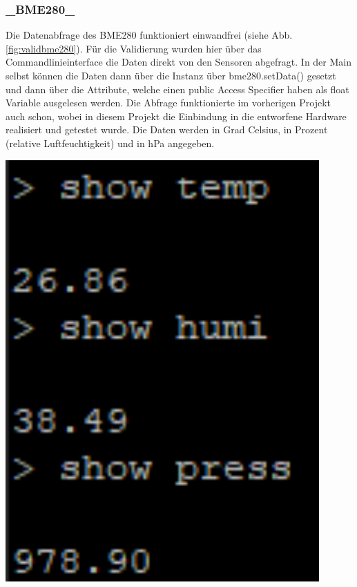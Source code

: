 \subsubsection{\_BME280\_}
\label{subsubsec:val_BME280}
\begin{minipage}[b][6.5cm][t]{0.48\textwidth}
Die Datenabfrage des BME280 funktioniert einwandfrei (siehe Abb. \ref{fig:validbme280}). Für die Validierung wurden hier über das Commandlinieinterface die Daten direkt von den Sensoren abgefragt. In der Main selbst können die Daten dann über die Instanz über bme280.setData() gesetzt und dann über die Attribute, welche einen public Access Specifier haben als float Variable ausgelesen werden. Die Abfrage funktionierte im vorherigen Projekt auch schon, wobei in diesem Projekt die Einbindung in die entworfene Hardware realisiert und getestet wurde. Die Daten werden in Grad Celsius, in Prozent (relative Luftfeuchtigkeit) und in hPa angegeben.\\
\end{minipage}
\begin{minipage}[b][6.5cm][t]{0.4\textwidth}
\centering
\includegraphics[width=0.9\textwidth]{../../graphics/FW_val/bme280.PNG}
\label{fig:validbme280}
\end{minipage}

